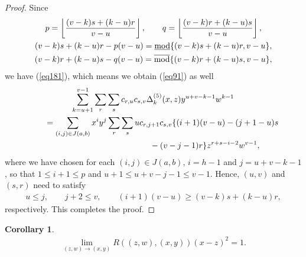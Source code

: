 \documentclass[pdftex]{sigma}
\numberwithin{equation}{section}
\newtheorem{kei}[teiri]{Corollary}
\theoremstyle{definition}
\begin{document}
\begin{proof}
Since
\begin{gather*}p=\left\lfloor \frac{(v-k)s+(k-u)r}{v-u}\right\rfloor,\qquad
q=\left\lfloor \frac{(v-k)r+(k-u)s}{v-u}\right\rfloor,\\
(v-k)s+(k-u)r-p(v-u)=\underline{\rm mod}\{(v-k)s+(k-u)r,v-u\},\\
(v-k)r+(k-u)s-q(v-u)=\overline{\rm mod}\{(v-k)r+(k-u)s,v-u\},\end{gather*}
we have (\ref{eq181}), which means we obtain (\ref{eq91}) as well
\begin{gather*}
\sum_{k=u+1}^{v-1}\sum_r\sum_s c_{r,u}c_{s,v}\Delta_k^{(5)}(x,z)y^{u+v-k-1}w^{k-1} \\
\qquad {} =\sum_{(i,j)\in J(a,b)}x^iy^j\sum_r\sum_s uc_{r,j+1}c_{s,v} \{(i+1)(v-u)-(j+1-u)s\\
\qquad \hphantom{=\sum_{(i,j)\in J(a,b)}x^iy^j\sum_r\sum_s}{}-(v-j-1)r\}z^{r+s-i-2}w^{v-1},
\end{gather*}
where we have chosen for each $(i,j)\in J(a,b)$, $i=h-1$ and $j=u+v-k-1$, so that $1\leq i+1\leq p$ and $u+1\leq u+v-j-1 \leq v-1$. Hence, $(u,v)$ and $(s,r)$ need to satisfy
\begin{gather*}u\leq j,\qquad j+2\leq v,\qquad (i+1)(v-u)\geq (v-k)s+(k-u)r,
\end{gather*}
respectively. This completes the proof.
\end{proof}

\begin{kei}
\begin{gather*}\lim_{(z,w)\rightarrow (x,y)}R((z,w),(x,y))(x-z)^2=1.\end{gather*}
\end{kei}
\end{document}
